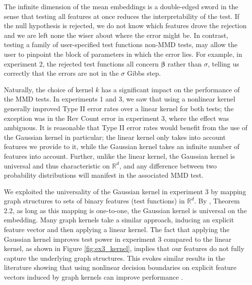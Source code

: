 \documentclass[a4paper,12pt]{article}
\begin{document}
The infinite dimension of the mean embeddings is a double-edged sword in the sense that testing all features at once reduces the interpretability of the test. If the null hypothesis is rejected, we do not know which features drove the rejection and we are left none the wiser about where the error might be. In contrast, testing a family of user-specified test functions non-MMD tests, may allow the user to pinpoint the block of parameters in which the error lies. For example, in experiment 2, the rejected test functions all concern $\mathbf{\beta}$ rather than $\sigma$, telling us correctly that the errors are not in the $\sigma$ Gibbs step.

Naturally, the choice of kernel $k$ has a significant impact on the performance of the MMD tests. In experiments 1 and 3, we saw that using a nonlinear kernel generally improved Type II error rates over a linear kernel for both tests; the exception was in the Rev Count error in experiment 3, where the effect was ambiguous. It is reasonable that Type II error rates would benefit from the use of the Gaussian kernel in particular; the linear kernel only takes into account features we provide to it, while the Gaussian kernel takes an infinite number of features into account. Further, unlike the linear kernel, the Gaussian kernel is universal and thus characteristic on $\mathbb{R}^{d}$, and any difference between two probability distributions will manifest in the associated MMD test.

We exploited the universality of the Gaussian kernel in experiment 3 by mapping graph structures to sets of binary features (test functions) in $\mathbb{R}^{d}$. By \cite{christmann_universal_2010}, Theorem 2.2, as long as this mapping is one-to-one, the Gaussian kernel is universal on the embedding. Many graph kernels take a similar approach, inducing an explicit feature vector and then applying a linear kernel. The fact that applying the Gaussian kernel improves test power in experiment 3 compared to the linear kernel, as shown in Figure \ref{fig:ex3_kernel}, implies that our features do not fully capture the underlying graph structures. This evokes similar results in the literature showing that using nonlinear decision boundaries on explicit feature vectors induced by graph kernels can improve performance \cite{kriege_survey_2020}. 
\end{document}

